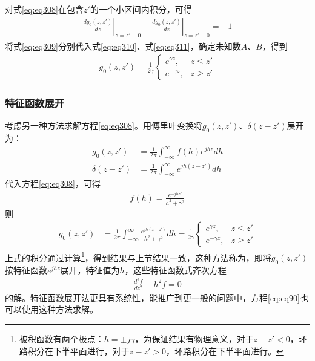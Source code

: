 \documentclass{article}
\numberwithin{equation}{section}
\begin{document}
对式\ref{eq:eq308}在包含$z'$的一个小区间内积分，可得
\begin{align}
    \label{eq:eq311}
    \left.\frac{dg_0(z,z')}{dz}\right|_{z=z'+0}-\left.\frac{dg_0(z,z')}{dz}\right|_{z=z'-0}=-1
\end{align}
将式\ref{eq:eq309}分别代入式\ref{eq:eq310}、式\ref{eq:eq311}，确定未知数$A$、$B$，得到
\begin{align}
    \label{eq:eq312}
    g_0(z,z')=\frac{1}{2\gamma}
    \left\{
        \begin{array}{lr}
            e^{\gamma z}, &z\leq z' \\
            e^{-\gamma z}, &z\geq z'
        \end{array}
    \right.
\end{align}
\subsubsection{特征函数展开}
考虑另一种方法求解方程\ref{eq:eq308}。用傅里叶变换将$g_0(z,z')$、$\delta(z-z')$展开为：
\begin{align}
    \label{eq:eq313}
    g_0(z,z')&=\frac{1}{2\pi}\int^{\infty}_{-\infty}f(h)e^{jhz}dh \\
    \label{eq:eq314}
    \delta(z-z')&=\frac{1}{2\pi}\int^{\infty}_{-\infty}e^{jh(z-z')}dh
\end{align}
代入方程\ref{eq:eq308}，可得
\begin{align}
    \label{eq:eq315}
    f(h)=\frac{e^{-jhz'}}{h^2+\gamma^2}
\end{align}
则
\begin{align}
    \label{eq:eq316}
    g_0(z,z')&=\frac{1}{2\pi}\int^{\infty}_{-\infty}\frac{e^{jh(z-z')}}{h^2+\gamma^2}dh=\frac{1}{2\gamma}
    \left\{
        \begin{array}{lr}
            e^{\gamma z}, &z\leq z' \\
            e^{-\gamma z}, &z\geq z'
        \end{array}
    \right.
\end{align}
上式的积分通过\textbf{\color{blue}{柯西留数定理}}计算\footnote{被积函数有两个极点：$h=\pm j\gamma$，为保证结果有物理意义，对于$z-z'<0$，环路积分在下半平面进行，对于$z-z'>0$，环路积分在下半平面进行。}，得到结果与上节结果一致，这种方法称为\textbf{\color{blue}{特征函数展开法}}，即将$g_0(z,z')$按特征函数$e^{jhz}$展开，特征值为$h$，这些特征函数式齐次方程
\begin{align}
    \label{eq:eq317}
    \frac{d^2f}{dz^2}-h^2f=0
\end{align}
的解。特征函数展开法更具有系统性，能推广到更一般的问题中，方程\ref{eq:eq90}也可以使用这种方法求解。
\end{document}
